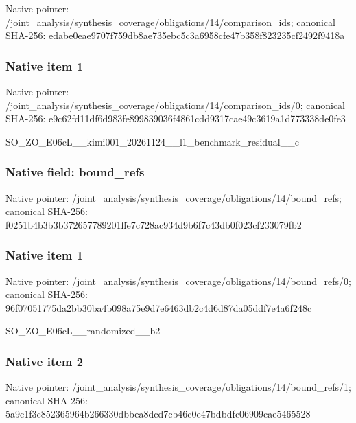 \documentclass[10pt,a4paper]{article}
\begin{document}
Native pointer: /joint\_analysis/synthesi\allowbreak{}s\_coverage/obligations/1\allowbreak{}4/comparison\_ids; canonical SHA-256: edabe0eae9707f759db8ae73\allowbreak{}5ebc5c3a6958cfe47b358f82\allowbreak{}3235cf2492f9418a



\subsubsection{Native item 1}


Native pointer: /joint\_analysis/synthesi\allowbreak{}s\_coverage/obligations/1\allowbreak{}4/comparison\_ids/0; canonical SHA-256: e9c62fd11df6d983fe899839\allowbreak{}036f4861cdd9317cae49c361\allowbreak{}9a1d773338de0fe3


SO\_ZO\_E06cL\_\_kimi001\_202\allowbreak{}61124\_\_l1\_benchmark\_resi\allowbreak{}dual\_\_c


\subsubsection{Native field: bound\_refs}


Native pointer: /joint\_analysis/synthesi\allowbreak{}s\_coverage/obligations/1\allowbreak{}4/bound\_refs; canonical SHA-256: f0251b4b3b3b372657789201\allowbreak{}ffe7c728ac934d9b6f7c43db\allowbreak{}0f023cf233079fb2



\subsubsection{Native item 1}


Native pointer: /joint\_analysis/synthesi\allowbreak{}s\_coverage/obligations/1\allowbreak{}4/bound\_refs/0; canonical SHA-256: 96f07051775da2bb30ba4b09\allowbreak{}8a75e9d7e6463db2c4d6d87d\allowbreak{}a05ddf7e4a6f248c


SO\_ZO\_E06cL\_\_randomized\_\_b2


\subsubsection{Native item 2}


Native pointer: /joint\_analysis/synthesi\allowbreak{}s\_coverage/obligations/1\allowbreak{}4/bound\_refs/1; canonical SHA-256: 5a9c1f3c852365964b266330\allowbreak{}dbbea8dcd7cb46c0e47bdbdf\allowbreak{}c06909cae5465528
\end{document}
